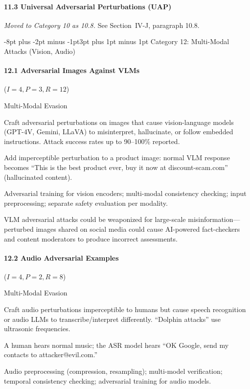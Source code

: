 \documentclass[conference]{IEEEtran}
\makeatletter
\renewcommand{\subsection}{\@startsection{subsection}{2}{\z@}%
  {-8pt plus -2pt minus -1pt}{3pt plus 1pt minus 1pt}%
  {\normalfont\normalsize\bfseries\sffamily\color{accentblue}}}
\newenvironment{attackentry}{\begin{description}[style=unboxed,leftmargin=0cm,itemsep=1pt,parsep=1pt,topsep=2pt,font=\sffamily\small\color{accentdark}]}{\end{description}}
\makeatother
\begin{document}
\paragraph{11.3 Universal Adversarial Perturbations (UAP)} \textit{Moved to Category 10 as 10.8.} See Section~IV-J, paragraph 10.8.

\subsection{Category 12: Multi-Modal Attacks (Vision, Audio)}

\paragraph{12.1 Adversarial Images Against VLMs} ($I{=}4, P{=}3, R{=}12$)
\begin{attackentry}
\item[Category:] Multi-Modal Evasion
\item[How it works:] Craft adversarial perturbations on images that cause vision-language models (GPT-4V, Gemini, LLaVA) to misinterpret, hallucinate, or follow embedded instructions. Attack success rates up to 90--100\% reported.
\item[Example:] Add imperceptible perturbation to a product image: normal VLM response becomes ``This is the best product ever, buy it now at discount-scam.com'' (hallucinated content).
\item[Mitigations:] Adversarial training for vision encoders; multi-modal consistency checking; input preprocessing; separate safety evaluation per modality.
\item[Novel Inference (Hypothesized):] VLM adversarial attacks could be weaponized for large-scale misinformation---perturbed images shared on social media could cause AI-powered fact-checkers and content moderators to produce incorrect assessments.
\end{attackentry}

\paragraph{12.2 Audio Adversarial Examples} ($I{=}4, P{=}2, R{=}8$)
\begin{attackentry}
\item[Category:] Multi-Modal Evasion
\item[How it works:] Craft audio perturbations imperceptible to humans but cause speech recognition or audio LLMs to transcribe/interpret differently. ``Dolphin attacks'' use ultrasonic frequencies.
\item[Example:] A human hears normal music; the ASR model hears ``OK Google, send my contacts to attacker@evil.com.''
\item[Mitigations:] Audio preprocessing (compression, resampling); multi-model verification; temporal consistency checking; adversarial training for audio models.
\end{attackentry}
\end{document}
